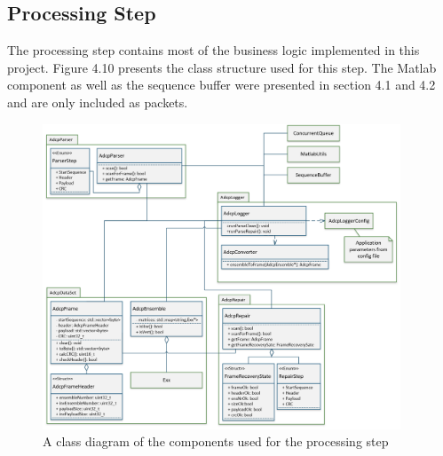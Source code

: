 \subsection{Processing Step}
The processing step contains most of the business logic implemented in this project. Figure 4.10 presents the class structure used for this step. The Matlab component as well as the sequence buffer were presented in section 4.1 and 4.2 and are only included as packets.

\begin{figure}[h]
\centering
      \includegraphics[width=0.95\textwidth]{logger_class}
        \caption{A class diagram of the components used for the processing step}
\end{figure}

